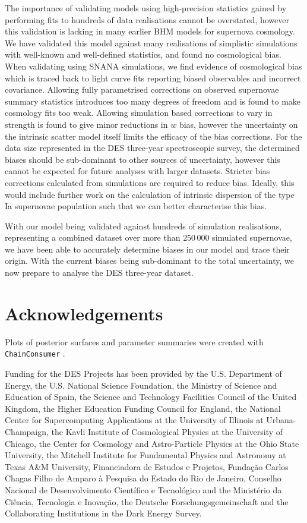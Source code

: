 \documentclass[a4paper,fleqn,usenatbib]{mnras}
\begin{document}
The importance of validating models using high-precision statistics gained by performing fits to hundreds of data realisations cannot be overstated, however this validation is lacking in many earlier BHM models for supernova cosmology. We have validated this model against many realisations of simplistic simulations with well-known and well-defined statistics, and found no cosmological bias. When validating using SNANA simulations, we find evidence of cosmological bias which is traced back to light curve fits reporting biased observables and incorrect covariance. Allowing fully parametrised corrections on observed supernovae summary statistics introduces too many degrees of freedom and is found to make cosmology fits too weak. Allowing simulation based corrections to vary in strength is found to give minor reductions in $w$ bias, however the uncertainty on the intrinsic scatter model itself limits the efficacy of the bias corrections. For the data size represented in the DES three-year spectroscopic survey, the determined biases should be sub-dominant to other sources of uncertainty, however this cannot be expected for future analyses with larger datasets. Stricter bias corrections calculated from simulations are required to reduce bias. Ideally, this would include further work on the calculation of intrinsic dispersion of the type Ia supernovae population such that we can better characterise this bias.

With our model being validated against hundreds of simulation realisations, representing a combined dataset over more than $250\,000$ simulated supernovae, we have been able to accurately determine biases in our model and trace their origin. With the current biases being sub-dominant to the total uncertainty, we now prepare to analyse the DES three-year dataset.

\section*{Acknowledgements}

Plots of posterior surfaces and parameter summaries were created with \verb|ChainConsumer| \citep{Hinton2016}.


Funding for the DES Projects has been provided by the U.S. Department of Energy, the U.S. National Science Foundation, the Ministry of Science and Education of Spain, 
the Science and Technology Facilities Council of the United Kingdom, the Higher Education Funding Council for England, the National Center for Supercomputing 
Applications at the University of Illinois at Urbana-Champaign, the Kavli Institute of Cosmological Physics at the University of Chicago, 
the Center for Cosmology and Astro-Particle Physics at the Ohio State University,
the Mitchell Institute for Fundamental Physics and Astronomy at Texas A\&M University, Financiadora de Estudos e Projetos, 
Funda{\c c}{\~a}o Carlos Chagas Filho de Amparo {\`a} Pesquisa do Estado do Rio de Janeiro, Conselho Nacional de Desenvolvimento Cient{\'i}fico e Tecnol{\'o}gico and 
the Minist{\'e}rio da Ci{\^e}ncia, Tecnologia e Inova{\c c}{\~a}o, the Deutsche Forschungsgemeinschaft and the Collaborating Institutions in the Dark Energy Survey. 
\end{document}
